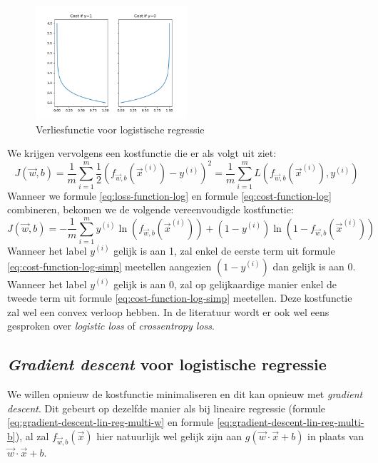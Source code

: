 \begin{figure}[h]
	\centering
	\includegraphics[width=0.5\textwidth]{images/10-loss-function-log.png}
	\caption{Verliesfunctie voor logistische regressie}
	\label{fig:loss-function-log}
\end{figure}
\noindent
We krijgen vervolgens een kostfunctie die er als volgt uit ziet:
\begin{equation}
	J(\vec{w}, b) = \frac{1}{m} \sum_{i=1}^{m} \frac{1}{2}(f_{\vec{w},b}(\vec{x}^{(i)}) - y^{(i)})^{2} = \frac{1}{m} \sum_{i=1}^{m} L(f_{\vec{w},b}(\vec{x}^{(i)}), y^{(i)})
	\label{eq:cost-function-log}
\end{equation}
\noindent
Wanneer we formule \ref{eq:loss-function-log} en formule \ref{eq:cost-function-log} combineren, bekomen we de volgende vereenvoudigde kostfunctie:
\begin{equation}
	J(\vec{w}, b) = -\frac{1}{m} \sum_{i=1}^{m} y^{(i)}\ln(f_{\vec{w},b}(\vec{x}^{(i)})) + (1 - y^{(i)}) \ln(1 - f_{\vec{w},b}(\vec{x}^{(i)})) 
	\label{eq:cost-function-log-simp}
\end{equation}
\noindent
Wanneer het label $y^{(i)}$ gelijk is aan 1, zal enkel de eerste term uit formule \ref{eq:cost-function-log-simp} meetellen aangezien $(1 - y^{(i)})$ dan gelijk is aan 0. Wanneer het label $y^{(i)}$ gelijk is aan 0, zal op gelijkaardige manier enkel de tweede term uit formule \ref{eq:cost-function-log-simp} meetellen. Deze kostfunctie zal wel een convex verloop hebben. In de literatuur wordt er ook wel eens gesproken over \textit{logistic loss} of \textit{crossentropy loss}.

\subsection{\textit{Gradient descent} voor logistische regressie}

We willen opnieuw de kostfunctie minimaliseren en dit kan opnieuw met \textit{gradient descent}. Dit gebeurt op dezelfde manier als bij lineaire regressie (formule \ref{eq:gradient-descent-lin-reg-multi-w} en formule \ref{eq:gradient-descent-lin-reg-multi-b}), al zal $f_{\vec{w},b}(\vec{x})$ hier natuurlijk wel gelijk zijn aan $g(\vec{w} \cdot \vec{x} + b)$ in plaats van $\vec{w} \cdot \vec{x} + b$.

